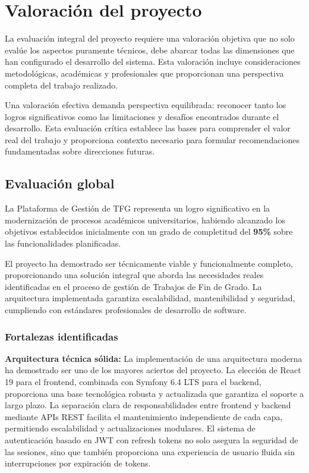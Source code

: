 \documentclass[12pt,a4paper,oneside]{report}
\begin{document}
\section{Valoración del proyecto}\label{valoraciuxf3n-del-proyecto}

La evaluación integral del proyecto requiere una valoración objetiva que no solo evalúe los aspectos puramente técnicos, debe abarcar todas las dimensiones que han configurado el desarrollo del sistema. Esta valoración incluye consideraciones metodológicas, académicas y profesionales que proporcionan una perspectiva completa del trabajo realizado.

Una valoración efectiva demanda perspectiva equilibrada: reconocer tanto los logros significativos como las limitaciones y desafíos encontrados durante el desarrollo. Esta evaluación crítica establece las bases para comprender el valor real del trabajo y proporciona contexto necesario para formular recomendaciones fundamentadas sobre direcciones futuras.

\subsection{Evaluación global}\label{evaluaciuxf3n-global}

La Plataforma de Gestión de TFG representa un logro significativo en la
modernización de procesos académicos universitarios, habiendo alcanzado
los objetivos establecidos inicialmente con un grado de completitud del
\textbf{95\%} sobre las funcionalidades planificadas.

El proyecto ha demostrado ser técnicamente viable y funcionalmente
completo, proporcionando una solución integral que aborda las
necesidades reales identificadas en el proceso de gestión de Trabajos de
Fin de Grado. La arquitectura implementada garantiza escalabilidad,
mantenibilidad y seguridad, cumpliendo con estándares profesionales de
desarrollo de software.

\subsubsection{Fortalezas identificadas}\label{fortalezas-identificadas}

\textbf{Arquitectura técnica sólida:} La implementación de una arquitectura moderna ha demostrado ser uno de los mayores aciertos del proyecto. La elección de React 19 para el frontend, combinada con Symfony 6.4 LTS para el backend, proporciona una base tecnológica robusta y actualizada que garantiza el soporte a largo plazo. La separación clara de responsabilidades entre frontend y backend mediante APIs REST facilita el mantenimiento independiente de cada capa, permitiendo escalabilidad y actualizaciones modulares. El sistema de autenticación basado en JWT con refresh tokens no solo asegura la seguridad de las sesiones, sino que también proporciona una experiencia de usuario fluida sin interrupciones por expiración de tokens.
\end{document}
